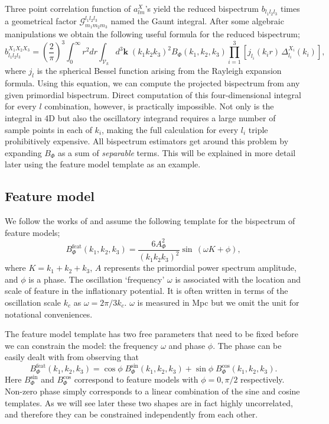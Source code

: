 Three point correlation function of $a_{lm}^X$'s yield the reduced bispectrum $b_{l_1 l_2 l_3}$ times a geometrical factor $\mathcal{G}^{l_1 l_2 l_3}_{m_1 m_2 m_3}$ named the Gaunt integral. After some algebraic manipulations we obtain the following useful formula for the reduced bispectrum;
\begin{equation}
	b_{l_1 l_2 l_3}^{X_1 X_2 X_3} = \left(\frac{2}{\pi}\right)^3 \int_{0}^{\infty} r^2 dr \int_{\mathcal{V}_k} d^3\textbf{k} \; (k_1 k_2 k_3)^2 B_\Phi (k_1, k_2, k_3) \prod_{i=1}^{3} \left[ j_{l_i}(k_i r) \, \Delta_{l_i}^{X_i}(k_i) \right],
	\label{reduced bispectrum}
\end{equation}
where $j_l$ is the spherical Bessel function arising from the Rayleigh expansion formula. Using this equation, we can compute the projected bispectrum from any given primordial bispectrum. Direct computation of this four-dimensional integral for every $l$ combination, however, is practically impossible. Not only is the integral in 4D but also the oscillatory integrand requires a large number of sample points in each of $k_i$, making the full calculation for every $l_i$ triple prohibitively expensive. All bispectrum estimators get around this problem by expanding $B_\Phi$ as a sum of \textit{separable} terms. This will be explained in more detail later using the feature model template as an example.

\subsection{Feature model}

We follow the works of \cite{Munchmeyer2014,Fergusson2015a,Fergusson2015b,PlanckCollaboration2015} and assume the following template for the bispectrum of feature models;
\begin{equation}
	B_\Phi ^ {\text{feat}}(k_1, k_2, k_3) = \frac{6 A_\Phi^2}{(k_1 k_2 k_3)^2} \sin\,(\omega K + \phi),
	\label{feature model definition}
\end{equation}
where $K = k_1 + k_2 + k_3$, $A$ represents the primordial power spectrum amplitude, and $\phi$ is a phase. The oscillation `frequency' $\omega$ is associated with the location and scale of feature in the inflationary potential. It is often written in terms of the oscillation scale $k_c$ as $\omega = 2\pi/3k_c$. $\omega$ is measured in Mpc but we omit the unit for notational conveniences.

The feature model template has two free parameters that need to be fixed before we can constrain the model: the frequency $\omega$ and phase $\phi$. The phase can be easily dealt with from observing that
\begin{equation}
	B_\Phi^\text{feat}(k_1, k_2, k_3) = \cos\phi \; B_\Phi^\text{sin} (k_1, k_2, k_3) + \sin\phi \; B_\Phi^\text{cos} (k_1, k_2, k_3).
	\label{feature model bispectrum as a sum of sin and cos}
\end{equation}
Here $B_\Phi^\text{sin}$ and $B_\Phi^\text{cos}$ correspond to feature models with $\phi = 0, \pi/2$ respectively. Non-zero phase simply corresponds to a linear combination of the sine and cosine templates. As we will see later these two shapes are in fact highly uncorrelated, and therefore they can be constrained independently from each other.

